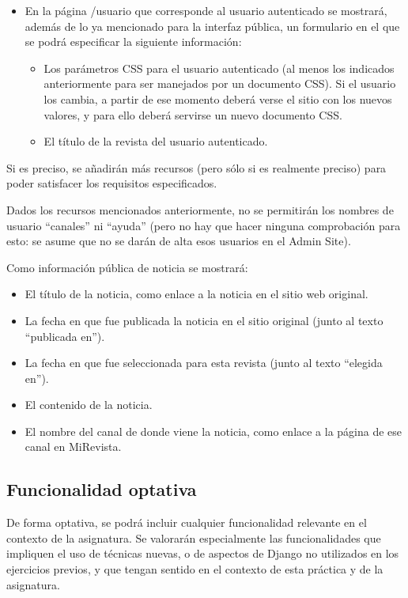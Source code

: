 \begin{itemize}
\item En la página /usuario que corresponde al usuario autenticado se mostrará, además de lo ya mencionado para la interfaz pública, un formulario en el que se podrá especificar la siguiente información:

  \begin{itemize}
  \item Los parámetros CSS para el usuario autenticado (al menos los indicados anteriormente para ser manejados por un documento CSS). Si el usuario los cambia, a partir de ese momento deberá verse el sitio con los nuevos valores, y para ello deberá servirse un nuevo documento CSS.
  \item El título de la revista del usuario autenticado.
  \end{itemize}
\end{itemize}

Si es preciso, se añadirán más recursos (pero sólo si es realmente preciso) para poder satisfacer los requisitos especificados.

Dados los recursos mencionados anteriormente, no se permitirán los nombres de usuario ``canales'' ni ``ayuda'' (pero no hay que hacer ninguna comprobación para esto: se asume que no se darán de alta esos usuarios en el Admin Site).


Como información pública de noticia se mostrará:
\begin{itemize}
\item El título de la noticia, como enlace a la noticia en el sitio web original.
\item La fecha en que fue publicada la noticia en el sitio original (junto al texto ``publicada en'').
\item La fecha en que fue seleccionada para esta revista (junto al texto ``elegida en'').
\item El contenido de la noticia.
\item El nombre del canal de donde viene la noticia, como enlace a la página de ese canal en MiRevista.
  \end{itemize}



\subsection{Funcionalidad optativa}

De forma optativa, se podrá incluir cualquier funcionalidad relevante en el contexto de la asignatura. Se valorarán especialmente las funcionalidades que impliquen el uso de técnicas nuevas, o de aspectos de Django no utilizados en los ejercicios previos, y que tengan sentido en el contexto de esta práctica y de la asignatura.

